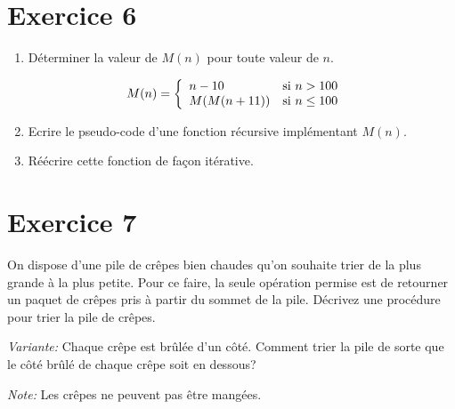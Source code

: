 \documentclass[a4paper,10pt]{article}
\begin{document}
\section*{Exercice 6}

\begin{enumerate}

\item Déterminer la valeur de $M(n)$ pour toute valeur de $n$.

\begin{align*}
M(n) &= \left\{
    \begin{array}{l l}
        n - 10 & \text{si } n > 100 \\
        M(M(n+11)) & \text{si } n \leq 100\\
    \end{array} \right.
\end{align*}

\item Ecrire le pseudo-code d'une fonction récursive implémentant $M(n)$.
\item Réécrire cette fonction de façon itérative.

\end{enumerate}

\section*{Exercice 7}

On dispose d'une pile de crêpes bien chaudes qu'on souhaite trier de la plus
grande à la plus petite. Pour ce faire, la seule opération permise est
de retourner un paquet de crêpes pris à partir du sommet de la pile.
Décrivez une procédure pour trier la pile de crêpes.

\textit{Variante:} Chaque crêpe est brûlée d'un côté. Comment trier la pile de sorte
que le côté brûlé de chaque crêpe soit en dessous?

\textit{Note:} Les crêpes ne peuvent pas être mangées.
\end{document}
